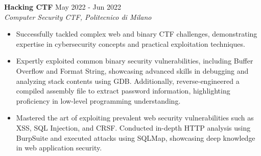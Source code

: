 
\noindent
\textbf{Hacking CTF} \hfill May 2022 - Jun 2022 \\
\textit{Computer Security CTF, Politecnico di Milano}

\begin{itemize}[noitemsep,topsep=0pt]
    \item Successfully tackled complex web and binary CTF challenges, demonstrating expertise in cybersecurity concepts and practical exploitation techniques.
    \item Expertly exploited common binary security vulnerabilities, including Buffer Overflow and Format String, showcasing advanced skills in debugging and analyzing stack contents using GDB. Additionally, reverse-engineered a compiled assembly file to extract password information, highlighting proficiency in low-level programming understanding.
    \item Mastered the art of exploiting prevalent web security vulnerabilities such as XSS, SQL Injection, and CRSF. Conducted in-depth HTTP analysis using BurpSuite and executed attacks using SQLMap, showcasing deep knowledge in web application security.
\end{itemize}

\vspace{4pt}

